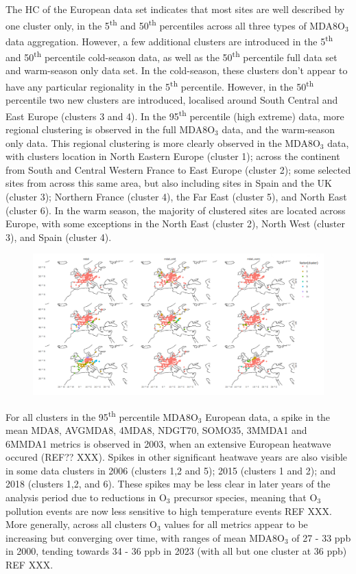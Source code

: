 \documentclass[journal abbreviation, manuscript]{copernicus}
\begin{document}
The HC of the European data set indicates that most sites are well described by one cluster only, in the 5\textsuperscript{th} and 50\textsuperscript{th} percentiles across all three types of MDA8O$_3$ data aggregation. However, a few additional clusters are introduced in the 5\textsuperscript{th} and 50\textsuperscript{th} percentile cold-season data, as well as the 50\textsuperscript{th} percentile full data set and warm-season only data set. In the cold-season, these clusters don't appear to have any particular regionality in the 5\textsuperscript{th} percentile. However, in the 50\textsuperscript{th} percentile two new clusters are introduced, localised around South Central and East Europe (clusters 3 and 4). In the 95\textsuperscript{th} percentile (high extreme) data, more regional clustering is observed in the full MDA8O$_3$ data, and the warm-season only data. This regional clustering is more clearly observed in the MDA8O$_3$ data, with clusters location in North Eastern Europe (cluster 1); across the continent from South and Central Western France to East Europe (cluster 2); some selected sites from across this same area, but also including sites in Spain and the UK (cluster 3); Northern France (cluster 4), the Far East (cluster 5), and North East (cluster 6). In the warm season, the majority of clustered sites are located across Europe, with some exceptions in the North East (cluster 2), North West (cluster 3), and Spain (cluster 4).

\begin{figure}[h]
    \centering
    \includegraphics[width=\linewidth]{figures//temporary_clusters/eu_cluster.png}
\end{figure}

For all clusters in the 95\textsuperscript{th} percentile MDA8O$_3$ European data, a spike in the mean MDA8, AVGMDA8, 4MDA8, NDGT70, SOMO35, 3MMDA1 and 6MMDA1 metrics is observed in 2003, when an extensive European heatwave occured (REF?? XXX). Spikes in other significant heatwave years are also visible in some data clusters in 2006 (clusters 1,2 and 5); 2015 (clusters 1 and 2); and 2018 (clusters 1,2, and 6). These spikes may be less clear in later years of the analysis period due to reductions in O$_3$ precursor species, meaning that O$_3$ pollution events are now less sensitive to high temperature events REF XXX. More generally, across all clusters O$_3$ values for all metrics appear to be increasing but converging over time, with ranges of mean MDA8O$_3$ of 27 - 33 ppb in 2000, tending towards 34 - 36 ppb in 2023 (with all but one cluster at 36 ppb) REF XXX.
\end{document}
